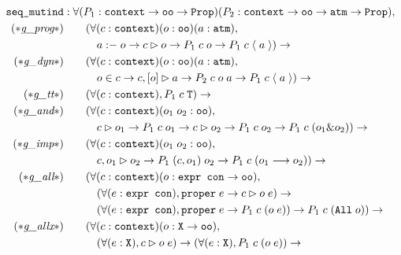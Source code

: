 \begin{figure}%
\vspace{-20pt}
\begin{align*}
\sltm{seq\_mutind} &: \forall (P_1 : \sltm{context} \rightarrow \sltm{oo} \rightarrow \coqtm{Prop}) (P_2 : \sltm{context} \rightarrow \sltm{oo} \rightarrow \sltm{atm} \rightarrow \coqtm{Prop}), \\
(* \rlnmsbc{} *) & \qquad (\forall (c : \sltm{context}) (o : \sltm{oo}) (a : \sltm{atm}), \\
& \qquad\quad \prog{a}{o} \rightarrow \seqsl[c]{o} \rightarrow P_1 \; c \; o \rightarrow P_1 \; c \; \atom{a}) \rightarrow \\
(* \rlnmsinit{} *) & \qquad (\forall (c : \sltm{context}) (o : \sltm{oo}) (a : \sltm{atm}), \\
& \qquad\quad o \in c \rightarrow \bchsl[c]{o}{a} \rightarrow P_2 \; c \; o \; a \rightarrow P_1 \; c \; \atom{a}) \rightarrow \\
(* \rlnmst{} *) & \qquad (\forall (c : \sltm{context}), P_1 \; c \; \sltm{T}) \rightarrow \\
(* \rlnmsand{} *) & \qquad (\forall (c : \sltm{context}) (o_1 \; o_2 : \sltm{oo}), \\
& \qquad\quad \seqsl[c]{o_1} \rightarrow P_1 \; c \; o_1 \rightarrow \seqsl[c]{o_2} \rightarrow P_1 \; c \; o_2 \rightarrow P_1 \; c \; (o_1 \& o_2)) \rightarrow \\
(* \rlnmsimp{} *) & \qquad (\forall (c : \sltm{context}) (o_1 \; o_2 : \sltm{oo}), \\
& \qquad\quad \seqsl[c,o_1]{o_2} \rightarrow P_1 \; (c,o_1) \; o_2 \rightarrow
P_1 \; c \; (o_1 \longrightarrow o_2)) \rightarrow \\
(* \rlnmsall{} *) & \qquad (\forall (c : \sltm{context}) (o : \sltm{expr con} \rightarrow \sltm{oo}), \\
& \qquad\quad (\forall (e : \sltm{expr con}), \hybridtm{proper} \; e \rightarrow \seqsl[c]{o \; e}) \rightarrow \\
& \qquad\quad (\forall (e : \sltm{expr con}), \hybridtm{proper} \; e \rightarrow P_1 \; c \; (o \; e)) \rightarrow
P_1 \; c \; (\sltm{All} \; o)) \rightarrow \\
(* \rlnmsalls{} *) & \qquad (\forall (c : \sltm{context}) (o : \sltm{X} \rightarrow \sltm{oo}), \\
& \qquad\quad (\forall (e : \sltm{X}), \seqsl[c]{o \; e}) \rightarrow (\forall (e : \sltm{X}), P_1 \; c \; (o \; e)) \rightarrow

\end{align*}
\end{figure}
